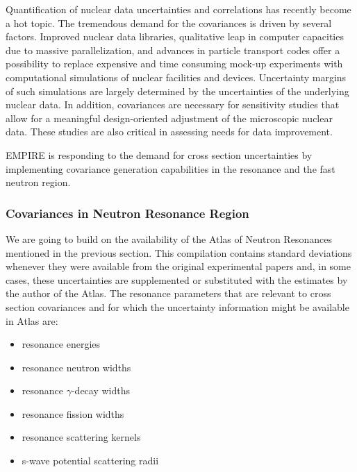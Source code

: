 Quantification of nuclear data uncertainties and correlations has recently
become a hot topic. The tremendous demand for the covariances is driven by
several factors. Improved nuclear data libraries, qualitative leap in
computer capacities due to massive parallelization, and advances in particle
transport codes offer a possibility to replace expensive and time consuming
mock-up experiments with computational simulations of nuclear facilities and
devices. Uncertainty margins of such simulations are largely determined by
the uncertainties of the underlying nuclear data. In addition, covariances
are necessary for sensitivity studies that allow for a meaningful
design-oriented adjustment of the microscopic nuclear data. These studies
are also critical in assessing needs for data improvement.

EMPIRE is responding to the demand for cross section uncertainties by
implementing covariance generation capabilities in the resonance and the
fast neutron region.

\subsubsection{Covariances in Neutron Resonance Region}

We are going to build on the availability of the Atlas of Neutron Resonances~%
\cite{Mughabghab:06} mentioned in the previous section. This compilation
contains standard deviations whenever they were available from the original
experimental papers and, in some cases, these uncertainties are supplemented
or substituted with the estimates by the author of the Atlas. The resonance
parameters that are relevant to cross section covariances and for which the
uncertainty information might be available in Atlas are:

\begin{itemize}
\item resonance energies

\item resonance neutron widths

\item resonance $\gamma$-decay widths

\item resonance fission widths

\item resonance scattering kernels

\item s-wave potential scattering radii
\end{itemize}

